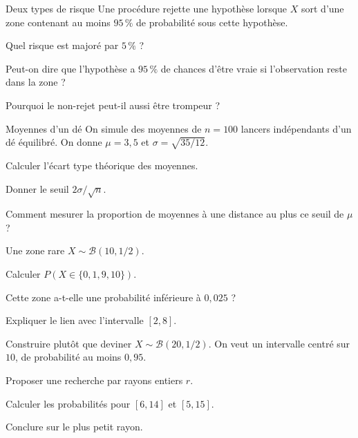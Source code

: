 \clearpage
{}
\begingroup\renewcommand{\otBesoinPlace}[1]{}\begin{minipage}{\linewidth}
\begin{exercice}[3]{Deux types de risque}
Une procédure rejette une hypothèse lorsque $X$ sort d’une zone contenant au moins $95\,\%$ de probabilité sous cette hypothèse.
\begin{questions}
\item Quel risque est majoré par $5\,\%$ ?
\item Peut-on dire que l’hypothèse a $95\,\%$ de chances d’être vraie si l’observation reste dans la zone ?
\item Pourquoi le non-rejet peut-il aussi être trompeur ?
\end{questions}
\end{exercice}
\begin{exercice}[3]{Moyennes d’un dé}
On simule des moyennes de $n=100$ lancers indépendants d’un dé équilibré. On donne $\mu=3{,}5$ et $\sigma=\sqrt{35/12}$.
\begin{questions}
\item Calculer l’écart type théorique des moyennes.
\item Donner le seuil $2\sigma/\sqrt n$.
\item Comment mesurer la proportion de moyennes à une distance au plus ce seuil de $\mu$ ?
\end{questions}
\end{exercice}
\begin{exercice}[3]{Une zone rare}
$X\sim\mathcal B(10,1/2)$.
\begin{questions}
\item Calculer $P(X\in\{0,1,9,10\})$.
\item Cette zone a-t-elle une probabilité inférieure à $0{,}025$ ?
\item Expliquer le lien avec l’intervalle $[2,8]$.
\end{questions}
\end{exercice}
\begin{exercice}[3]{Construire plutôt que deviner}
$X\sim\mathcal B(20,1/2)$. On veut un intervalle centré sur $10$, de probabilité au moins $0{,}95$.
\begin{questions}
\item Proposer une recherche par rayons entiers $r$.
\item Calculer les probabilités pour $[6,14]$ et $[5,15]$.
\item Conclure sur le plus petit rayon.
\end{questions}
\end{exercice}
\end{minipage}\endgroup
